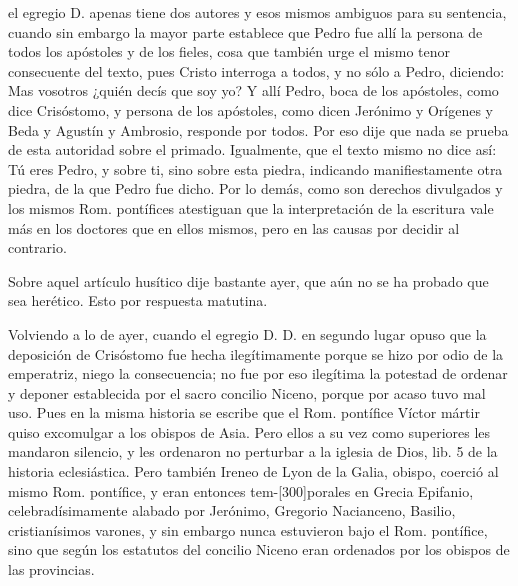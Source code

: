el egregio D. apenas tiene dos autores y esos mismos ambiguos para su sentencia, cuando sin embargo la mayor parte establece que Pedro fue allí la persona de todos los apóstoles y de los fieles, cosa que también urge el mismo tenor consecuente del texto, pues Cristo interroga a todos, y no sólo a Pedro, diciendo: Mas vosotros ¿quién decís que soy yo? Y allí Pedro, boca de los apóstoles, como dice Crisóstomo, y persona de los apóstoles, como dicen Jerónimo y Orígenes y Beda y Agustín y Ambrosio, responde por todos. Por eso dije que nada se prueba de esta autoridad sobre el primado. Igualmente, que el texto mismo no dice así: Tú eres Pedro, y sobre ti, sino sobre esta piedra, indicando manifiestamente otra piedra, de la que Pedro fue dicho. Por lo demás, como son derechos divulgados y los mismos Rom. pontífices atestiguan que la interpretación de la escritura vale más en los doctores que en ellos mismos, pero en las causas por decidir al contrario.

Sobre aquel artículo husítico dije bastante ayer, que aún no se ha probado que sea herético. Esto por respuesta matutina.

Volviendo a lo de ayer, cuando el egregio D. D. en segundo lugar opuso que la deposición de Crisóstomo fue hecha ilegítimamente porque se hizo por odio de la emperatriz, niego la consecuencia; no fue por eso ilegítima la potestad de ordenar y deponer establecida por el sacro concilio Niceno, porque por acaso tuvo mal uso. Pues en la misma historia se escribe que el Rom. pontífice Víctor mártir quiso excomulgar a los obispos de Asia. Pero ellos a su vez como superiores les mandaron silencio, y les ordenaron no perturbar a la iglesia de Dios, lib. 5 de la historia eclesiástica. Pero también Ireneo de Lyon de la Galia, obispo, coerció al mismo Rom. pontífice, y eran entonces tem-[300]porales en Grecia Epifanio, celebradísimamente alabado por Jerónimo, Gregorio Nacianceno, Basilio, cristianísimos varones, y sin embargo nunca estuvieron bajo el Rom. pontífice, sino que según los estatutos del concilio Niceno eran ordenados por los obispos de las provincias.

